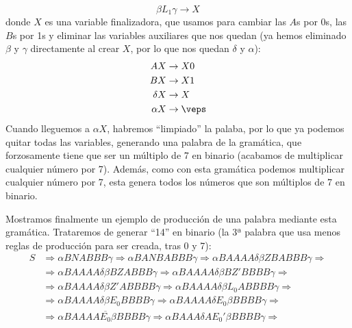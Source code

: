 \begin{ejercicio}
\begin{enumerate}
\begin{description}
\begin{itemize}
\begin{equation*}
                                \beta L_1 \gamma \rightarrow X
                            \end{equation*}
                            donde $X$ es una variable finalizadora, que usamos para cambiar las $A$s por 0s, las $B$s por 1s y eliminar las variables auxiliares que nos quedan (ya hemos eliminado $\beta$ y $\gamma$ directamente al crear $X$, por lo que nos quedan $\delta$ y $\alpha$):
                            \begin{align*}
                                AX &\rightarrow X0 \\
                                BX &\rightarrow X1 \\
                                \delta X &\rightarrow X \\
                                \alpha X &\rightarrow \veps
                            \end{align*}
                            Cuando lleguemos a $\alpha X$, habremos ``limpiado'' la palaba, por lo que ya podemos quitar todas las variables, generando una palabra de la gramática, que forzosamente tiene que ser un múltiplo de 7 en binario (acabamos de multiplicar cualquier número por 7). Además, como con esta gramática podemos multiplicar cualquier número por 7, esta genera todos los números que son múltiplos de 7 en binario.
                    \end{itemize}
                Mostramos finalmente un ejemplo de producción de una palabra mediante esta gramática. Trataremos de generar ``14'' en binario (la 3ª palabra que usa menos reglas de producción para ser creada, tras 0 y 7):
                \begin{align*}
                    S &\Rightarrow \alpha BNABBB \gamma \Rightarrow \alpha BANBABBB\gamma \Rightarrow \alpha BAAAA \delta \beta Z BABBB\gamma \Rightarrow \\
                      &\Rightarrow \alpha BAAAA\delta \beta BZABBB\gamma \Rightarrow \alpha BAAAA \delta \beta BZ' BBBB \gamma \Rightarrow \\
                      &\Rightarrow \alpha BAAAA \delta \beta Z' ABBBB \gamma \Rightarrow \alpha BAAAA\delta \beta L_0 ABBBB\gamma \Rightarrow \\
                      &\Rightarrow \alpha BAAAA\delta \beta E_0 BBBB \gamma \Rightarrow \alpha BAAAA\delta E_0 \beta BBBB\gamma \Rightarrow \\
                      &\Rightarrow \alpha BAAAA \overline{E_0}\beta BBBB\gamma \Rightarrow \alpha BAAA \delta A E_0' \beta BBBB \gamma \Rightarrow \\

\end{align*}
\end{description}
\end{enumerate}
\end{ejercicio}

